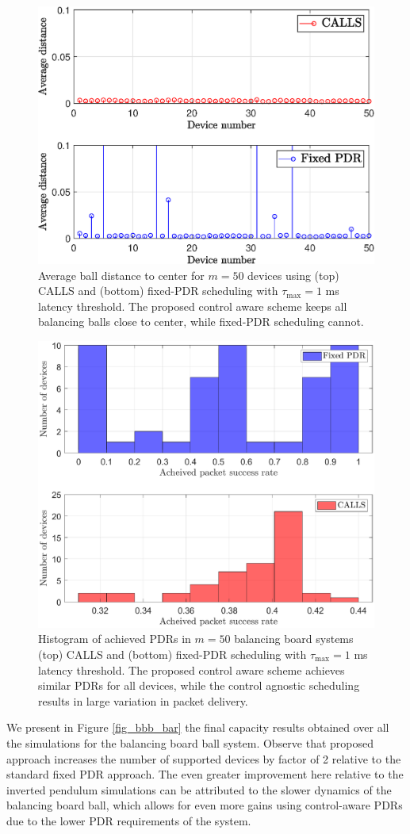 \begin{figure}
\centering
\includegraphics[width=.45\textwidth]{images/bbb_dist.eps}
\caption{Average ball distance to center for $m=50$ devices using (top) CALLS and (bottom) fixed-PDR scheduling with $\tau_{\max} =1$ ms latency threshold. The proposed control aware scheme keeps all balancing balls close to center, while fixed-PDR scheduling cannot.}
\label{fig_bbb_dist}
\end{figure}

\begin{figure}
\centering
\includegraphics[width=.45\textwidth]{images/bbb_psr.eps}
\caption{Histogram of achieved PDRs in $m=50$ balancing board systems (top) CALLS and (bottom) fixed-PDR scheduling with $\tau_{\max} =1$ ms latency threshold. The proposed control aware scheme achieves similar PDRs for all devices, while the control agnostic scheduling results in large variation in packet delivery.}
\label{fig_bbb_psr}
\end{figure}

We present in Figure \ref{fig_bbb_bar} the final capacity results obtained over all the simulations for the balancing board ball system. Observe that proposed approach increases the number of supported devices by factor of 2 relative to the standard fixed PDR approach. The even greater improvement here relative to the inverted pendulum simulations can be attributed to the slower dynamics of the balancing board ball, which allows for even more gains using control-aware PDRs due to the lower PDR requirements of the system.


